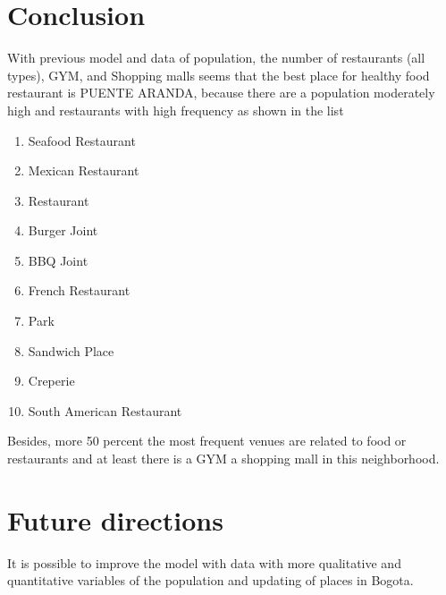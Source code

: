 {	\section{Conclusion}
	With previous model and data of population, the number of restaurants (all types), GYM, and Shopping malls seems that the best place for healthy food restaurant is PUENTE ARANDA, because there are a population moderately high and restaurants with high frequency as shown in the list
	\begin{enumerate}
		\item Seafood Restaurant
		\item Mexican Restaurant
		\item Restaurant
		\item Burger Joint
	 	\item BBQ Joint
	 	\item French Restaurant
	 	\item Park
	 	\item Sandwich Place
	 	\item Creperie
	 	\item South American Restaurant
	\end{enumerate}
	Besides, more 50 percent the most frequent venues are related to food or restaurants and at least there is a GYM a shopping mall in this neighborhood.
	\section{Future directions}
	It is possible to improve the model with data with more qualitative and quantitative variables of the population and updating of places in Bogota.
}\cleanalldata